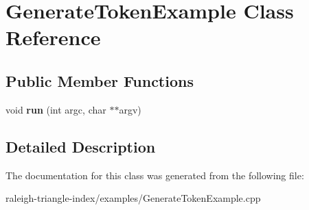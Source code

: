 \section{Generate\+Token\+Example Class Reference}
\label{class_generate_token_example}
\subsection*{Public Member Functions}
\begin{DoxyCompactItemize}
\item 
void {\bfseries run} (int argc, char $\ast$$\ast$argv)\label{class_generate_token_example_a7e549b9482984dceed99a7b70b85342f}

\end{DoxyCompactItemize}


\subsection{Detailed Description}


The documentation for this class was generated from the following file\+:\begin{DoxyCompactItemize}
\item 
raleigh-\/triangle-\/index/examples/Generate\+Token\+Example.\+cpp\end{DoxyCompactItemize}
